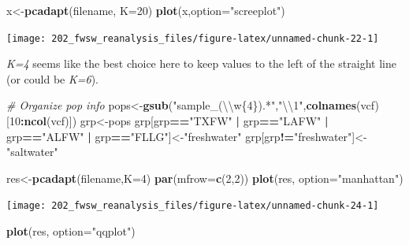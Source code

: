 \documentclass[]{article}
\newenvironment{Shaded}{\begin{snugshade}}{\end{snugshade}}
\newcommand{\KeywordTok}[1]{\textcolor[rgb]{0.13,0.29,0.53}{\textbf{#1}}}
\newcommand{\DataTypeTok}[1]{\textcolor[rgb]{0.13,0.29,0.53}{#1}}
\newcommand{\DecValTok}[1]{\textcolor[rgb]{0.00,0.00,0.81}{#1}}
\newcommand{\CharTok}[1]{\textcolor[rgb]{0.31,0.60,0.02}{#1}}
\newcommand{\StringTok}[1]{\textcolor[rgb]{0.31,0.60,0.02}{#1}}
\newcommand{\CommentTok}[1]{\textcolor[rgb]{0.56,0.35,0.01}{\textit{#1}}}
\newcommand{\OperatorTok}[1]{\textcolor[rgb]{0.81,0.36,0.00}{\textbf{#1}}}
\newcommand{\NormalTok}[1]{#1}
\begin{document}
\begin{Shaded}
\begin{Highlighting}[]
\NormalTok{x<-}\KeywordTok{pcadapt}\NormalTok{(filename, }\DataTypeTok{K=}\DecValTok{20}\NormalTok{)}
\KeywordTok{plot}\NormalTok{(x,}\DataTypeTok{option=}\StringTok{"screeplot"}\NormalTok{)}
\end{Highlighting}
\end{Shaded}

\texttt{[image: 202\_fwsw\_reanalysis\_files/figure-latex/unnamed-chunk-22-1]}

\emph{K=4} seems like the best choice here to keep values to the left of
the straight line (or could be \emph{K=6}).

\begin{Shaded}
\begin{Highlighting}[]
\CommentTok{# Organize pop info}
\NormalTok{pops<-}\KeywordTok{gsub}\NormalTok{(}\StringTok{"sample_(}\CharTok{\textbackslash{}\textbackslash{}}\StringTok{w\{4\}).*"}\NormalTok{,}\StringTok{"}\CharTok{\textbackslash{}\textbackslash{}}\StringTok{1"}\NormalTok{,}\KeywordTok{colnames}\NormalTok{(vcf)[}\DecValTok{10}\OperatorTok{:}\KeywordTok{ncol}\NormalTok{(vcf)])   }
\NormalTok{grp<-pops}
\NormalTok{grp[grp}\OperatorTok{==}\StringTok{"TXFW"} \OperatorTok{|}\StringTok{ }\NormalTok{grp}\OperatorTok{==}\StringTok{"LAFW"} \OperatorTok{|}\StringTok{ }\NormalTok{grp}\OperatorTok{==}\StringTok{"ALFW"} \OperatorTok{|}\StringTok{ }\NormalTok{grp}\OperatorTok{==}\StringTok{"FLLG"}\NormalTok{]<-}\StringTok{"freshwater"}
\NormalTok{grp[grp}\OperatorTok{!=}\StringTok{"freshwater"}\NormalTok{]<-}\StringTok{"saltwater"}
\end{Highlighting}
\end{Shaded}

\begin{Shaded}
\begin{Highlighting}[]
\NormalTok{res<-}\KeywordTok{pcadapt}\NormalTok{(filename,}\DataTypeTok{K=}\DecValTok{4}\NormalTok{)}
\KeywordTok{par}\NormalTok{(}\DataTypeTok{mfrow=}\KeywordTok{c}\NormalTok{(}\DecValTok{2}\NormalTok{,}\DecValTok{2}\NormalTok{))}
\KeywordTok{plot}\NormalTok{(res, }\DataTypeTok{option=}\StringTok{"manhattan"}\NormalTok{)}
\end{Highlighting}
\end{Shaded}

\texttt{[image: 202\_fwsw\_reanalysis\_files/figure-latex/unnamed-chunk-24-1]}

\begin{Shaded}
\begin{Highlighting}[]
\KeywordTok{plot}\NormalTok{(res, }\DataTypeTok{option=}\StringTok{"qqplot"}\NormalTok{)}
\end{Highlighting}
\end{Shaded}
\end{document}
